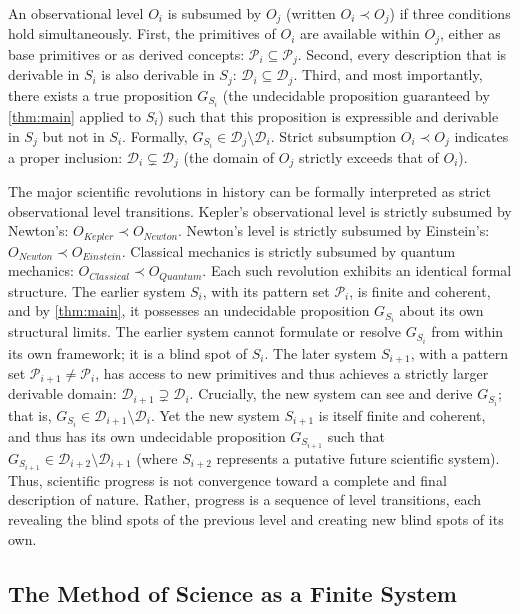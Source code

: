 \documentclass[11pt]{article}
\begin{document}
An observational level $O_i$ is subsumed by $O_j$ (written $O_i \prec O_j$) if three conditions hold simultaneously. First, the primitives of $O_i$ are available within $O_j$, either as base primitives or as derived concepts: $\mathcal{P}_i \subseteq \mathcal{P}_j$. Second, every description that is derivable in $S_i$ is also derivable in $S_j$: $\mathcal{D}_i \subseteq \mathcal{D}_j$. Third, and most importantly, there exists a true proposition $G_{S_i}$ (the undecidable proposition guaranteed by \ref{thm:main} applied to $S_i$) such that this proposition is expressible and derivable in $S_j$ but not in $S_i$. Formally, $G_{S_i} \in \mathcal{D}_j \setminus \mathcal{D}_i$. Strict subsumption $O_i \prec O_j$ indicates a proper inclusion: $\mathcal{D}_i \subsetneq \mathcal{D}_j$ (the domain of $O_j$ strictly exceeds that of $O_i$).

The major scientific revolutions in history can be formally interpreted as strict observational level transitions. Kepler's observational level is strictly subsumed by Newton's: $O_{Kepler} \prec O_{Newton}$. Newton's level is strictly subsumed by Einstein's: $O_{Newton} \prec O_{Einstein}$. Classical mechanics is strictly subsumed by quantum mechanics: $O_{Classical} \prec O_{Quantum}$. Each such revolution exhibits an identical formal structure. The earlier system $S_i$, with its pattern set $\mathcal{P}_i$, is finite and coherent, and by \ref{thm:main}, it possesses an undecidable proposition $G_{S_i}$ about its own structural limits. The earlier system cannot formulate or resolve $G_{S_i}$ from within its own framework; it is a blind spot of $S_i$. The later system $S_{i+1}$, with a pattern set $\mathcal{P}_{i+1} \neq \mathcal{P}_i$, has access to new primitives and thus achieves a strictly larger derivable domain: $\mathcal{D}_{i+1} \supsetneq \mathcal{D}_i$. Crucially, the new system can see and derive $G_{S_i}$; that is, $G_{S_i} \in \mathcal{D}_{i+1} \setminus \mathcal{D}_i$. Yet the new system $S_{i+1}$ is itself finite and coherent, and thus has its own undecidable proposition $G_{S_{i+1}}$ such that $G_{S_{i+1}} \in \mathcal{D}_{i+2} \setminus \mathcal{D}_{i+1}$ (where $S_{i+2}$ represents a putative future scientific system). Thus, scientific progress is not convergence toward a complete and final description of nature. Rather, progress is a sequence of level transitions, each revealing the blind spots of the previous level and creating new blind spots of its own.


\subsection{The Method of Science as a Finite System}
\label{subsec:method_as_system}
\end{document}
